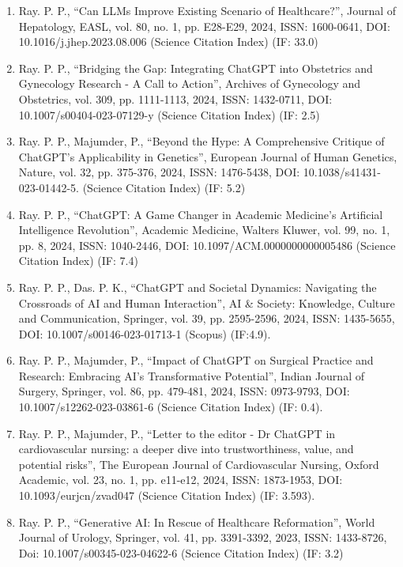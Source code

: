\documentclass[11pt,a4paper]{moderncv}
\begin{document}
\begin{adjustwidth}{6em}{0pt}
\begin{enumerate}
		\item Ray. P. P., “Can LLMs Improve Existing Scenario of Healthcare?”, Journal of Hepatology, EASL, vol. 80, no. 1, pp. E28-E29, 2024, ISSN: 1600-0641, DOI: 10.1016/j.jhep.2023.08.006 (Science Citation Index) (IF: 33.0)
		
		\item Ray. P. P., “Bridging the Gap: Integrating ChatGPT into Obstetrics and Gynecology Research - A Call to Action”, Archives of Gynecology and Obstetrics, vol. 309, pp. 1111-1113, 2024, ISSN: 1432-0711, DOI: 10.1007/s00404-023-07129-y (Science Citation Index) (IF: 2.5)
		
		\item Ray. P. P., Majumder, P., “Beyond the Hype: A Comprehensive Critique of ChatGPT’s Applicability in Genetics”, European Journal of Human Genetics, Nature, vol. 32, pp. 375-376, 2024, ISSN: 1476-5438, DOI: 10.1038/s41431-023-01442-5. (Science Citation Index) (IF: 5.2)
		
		\item Ray. P. P., “ChatGPT: A Game Changer in Academic Medicine's Artificial Intelligence Revolution”, Academic Medicine, Walters Kluwer, vol. 99, no. 1, pp. 8, 2024, ISSN: 1040-2446, DOI: 10.1097/ACM.0000000000005486 (Science Citation Index) (IF: 7.4)
		
		\item Ray. P. P., Das. P. K., “ChatGPT and Societal Dynamics: Navigating the Crossroads of AI and Human Interaction”, AI \& Society: Knowledge, Culture and Communication, Springer, vol. 39, pp. 2595-2596, 2024, ISSN: 1435-5655, DOI: 10.1007/s00146-023-01713-1 (Scopus) (IF:4.9). 
		
		\item 	Ray. P. P., Majumder, P., “Impact of ChatGPT on Surgical Practice and Research: Embracing AI's Transformative Potential”, Indian Journal of Surgery, Springer, vol. 86, pp. 479-481, 2024, ISSN: 0973-9793, DOI: 10.1007/s12262-023-03861-6 (Science Citation Index) (IF: 0.4). 
		
		\item Ray. P. P., Majumder, P., “Letter to the editor - Dr ChatGPT in cardiovascular nursing: a deeper dive into trustworthiness, value, and potential risks”, The European Journal of Cardiovascular Nursing, Oxford Academic, vol. 23, no. 1, pp. e11-e12, 2024, ISSN: 1873-1953, DOI: 10.1093/eurjcn/zvad047 (Science Citation Index) (IF: 3.593). 
		
		\item Ray. P. P., “Generative AI: In Rescue of Healthcare Reformation”, World Journal of Urology, Springer, vol. 41, pp. 3391-3392, 2023, ISSN: 1433-8726, Doi: 10.1007/s00345-023-04622-6 (Science Citation Index) (IF: 3.2)
		

\end{enumerate}
\end{adjustwidth}
\end{document}
